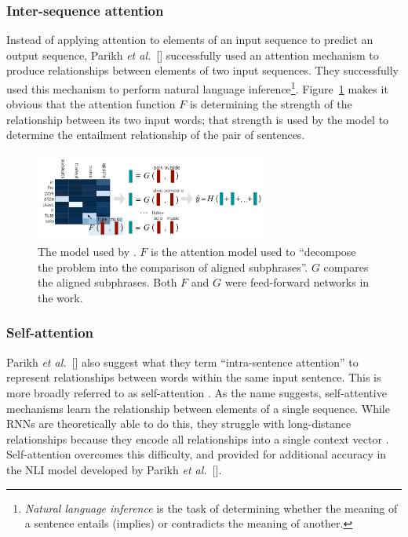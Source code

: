 \documentclass{article}
\newcommand{\etal}{\textit{et al.}}
\begin{document}
\subsubsection{Inter-sequence attention}

Instead of applying attention to elements of an input sequence to predict an output sequence, Parikh \etal~[\citeyear{natural_language_inference}] successfully used an attention mechanism to produce relationships between elements of two input sequences. They successfully used this mechanism to perform natural language inference\footnote{\textit{Natural language inference} is the task of determining whether the meaning of a sentence entails (implies) or contradicts the meaning of another.}. Figure~\ref{figure:inference} makes it obvious that the attention function $F$ is determining the strength of the relationship between its two input words; that strength is used by the model to determine the entailment relationship of the pair of sentences.

\begin{figure}
    \centering
    \includegraphics[width=3in]{figures/inference.png}
    \caption{The model used by \protect\cite{natural_language_inference}. $F$ is the attention model used to ``decompose the problem into the comparison of aligned subphrases''. $G$ compares the aligned subphrases. Both $F$ and $G$ were feed-forward networks in the work.}\label{figure:inference}
\end{figure}

\subsubsection{Self-attention}

Parikh \etal~[\citeyear{natural_language_inference}] also suggest what they term ``intra-sentence attention'' to represent relationships between words within the same input sentence. This is more broadly referred to as self-attention \cite{self_attentive_embedding,attn_all_you_need}. As the name suggests, self-attentive mechanisms learn the relationship between elements of a single sequence. While RNNs are theoretically able to do this, they struggle with long-distance relationships because they encode all relationships into a single context vector \cite{joint_align_translate}. Self-attention overcomes this difficulty, and provided for additional accuracy in the NLI model developed by Parikh \etal~[\citeyear{natural_language_inference}].
\end{document}
